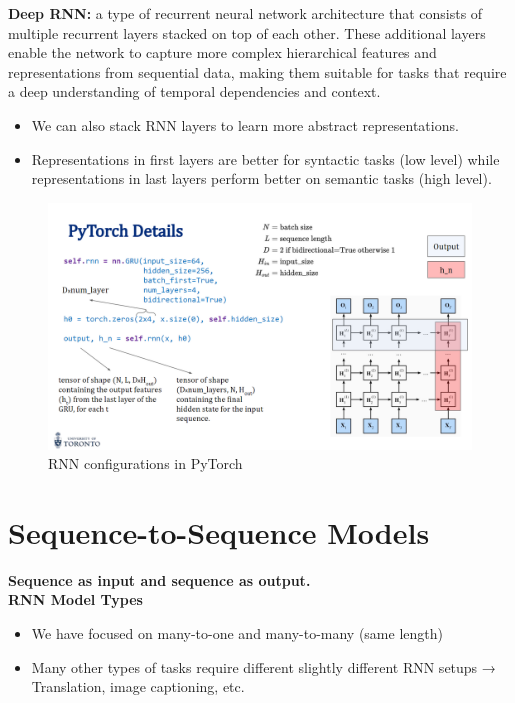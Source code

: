 \begin{definition}
    \textbf{Deep RNN:}  a type of recurrent neural network architecture that consists of multiple recurrent layers stacked on top of each other. These additional layers enable the network to capture more complex hierarchical features and representations from sequential data, making them suitable for tasks that require a deep understanding of temporal dependencies and context.
\end{definition}

\begin{itemize}
    \item We can also stack RNN layers to learn more abstract representations.
    \item Representations in first layers are better for syntactic tasks (low level) while representations in
last layers perform better on semantic tasks (high level).
\end{itemize}

\begin{figure}[h!t]
    \centering
    \includegraphics[width=1\linewidth]{pytorchdet.png}
    \caption{RNN configurations in PyTorch}
    \label{fig:enter-label}
\end{figure}

\newpage

\section{Sequence-to-Sequence Models}

\textbf{Sequence as input and sequence as output. }\\

\textbf{RNN Model Types}

\begin{itemize}
    \item We have focused on many-to-one and many-to-many (same length)
    \item Many other types of tasks require different slightly different RNN setups → Translation, image captioning, etc.
\end{itemize}

